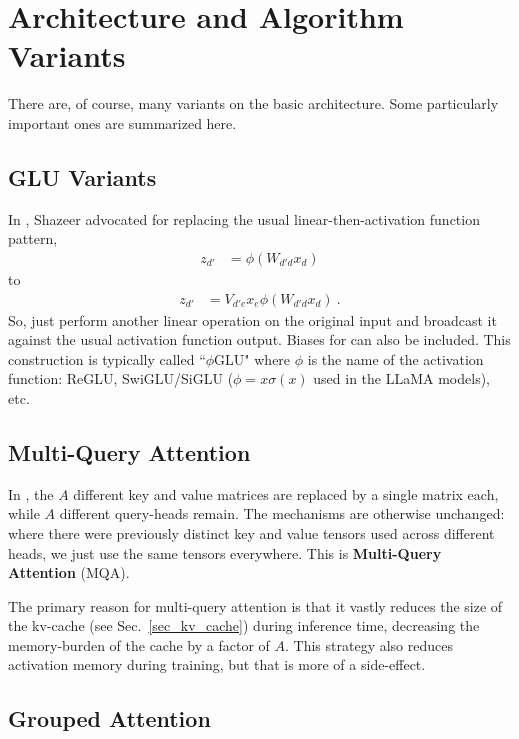 \documentclass[11pt]{article}
\begin{document}
\section{Architecture and Algorithm Variants}

There are, of course, many variants on the basic architecture. Some particularly important ones are
summarized here.

\subsection{GLU Variants\label{subsec_glu_variants}}

In \cite{shazeer2020gluvariantsimprovetransformer}, Shazeer advocated for replacing the usual
linear-then-activation function pattern,
\begin{align}
    z _{ d' } &= \phi \left  ( W _{ d' d } x _{ d } \right  )
\end{align}
to
\begin{align}
    z _{ d' } &=V _{ d'e }x _{ e } \phi \left ( W _{ d' d } x _{ d } \right  ) \ .
\end{align}
So, just perform another linear operation on the original input and broadcast it against the usual
activation function output. Biases for can also be included. This construction is typically called
``$ \phi $GLU" where $ \phi $ is the name of the activation function: ReGLU, SwiGLU/SiGLU ($ \phi=x
\sigma(x) $ used in the LLaMA models), etc.

\subsection{Multi-Query Attention \label{subsec_multi_query_attn}}

In \cite{shazeer2019fast}, the $ A $ different key and value matrices are replaced by a single
matrix each, while $ A$ different query-heads remain. The mechanisms are otherwise unchanged: where
there were previously distinct key and value tensors used across different heads, we just use the same
tensors everywhere. This is \textbf{Multi-Query Attention} (MQA).


The primary reason for multi-query attention is that it vastly reduces the size of the kv-cache (see
Sec.~\ref{sec_kv_cache}) during inference time, decreasing the memory-burden of the cache by a
factor of $ A $. This strategy also reduces activation memory during training, but that is more of a
side-effect.

\subsection{Grouped Attention \label{subsec_grouped_attn}}
\end{document}
